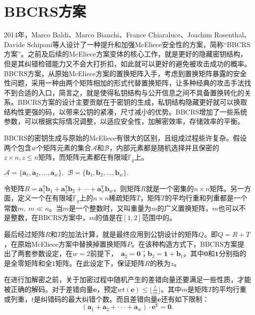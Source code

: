 \section{BBCRS方案}
2014年，Marco Baldi、Marco Bianchi、France Chiaraluce、Joachim Rosenthal、Davide Schipani等人设计了一种提升和加强McEliece安全性的方案，简称“BBCRS方案”。之前及后续的McEliece方案变体的核心工作，就是更好的隐藏密钥结构，但是其纠错检错能力又不会大打折扣，如此就可以更好的避免被攻击成功的概率\cite{Baldi2017Post}。BBCRS方案，从原始McEliece方案的置换矩阵入手，考虑到置换矩阵暴露的安全性问题，采用一种由两个矩阵相加的形式代替置换矩阵，让多种经典的攻击手法找不到合适的入口，简言之，就是使得私钥结构与公开信息之间不具备置换转化的关系。BBCRS方案的设计主要贡献在于密钥的生成，私钥结构隐藏更好就可以换取结构性更强的码，以带来公钥的紧凑，尺寸减小的优势。BBCRS增加了一些系统参数，可以根据实际情况调整，以适应安全性，加解密效率，存储效率的平衡。

BBCRS的密钥生成与原始的McEliece有很大的区别，且组成过程些许复杂。假设两个包含$w$个矩阵元素的集合$\mathcal{A}$和$\mathcal{B}$，内部元素都是随机选择并且保密的$z \times n, z \leq n$矩阵，而矩阵元素都在有限域$\mathbb{F}_q$上。
\begin{center}
	$\mathcal{A} = \{\mathbf{a}_1,\mathbf{a}_2,...,\mathbf{a}_w\},~$$~\mathcal{B} = \{\mathbf{b}_1,\mathbf{b}_2,...,\mathbf{b}_w\}.$
\end{center}
\begin{flushleft}
	令矩阵$R = \mathbf{a}_1^\mathtt{T}\mathbf{b}_1 + \mathbf{a}_2^\mathtt{T}\mathbf{b}_2 + \cdots + \mathbf{a}_w^\mathtt{T}\mathbf{b}_w$，则矩阵$R$就是一个密集的$n \times n$矩阵。另一方面，定义一个在有限域$\mathbb{F}_q$上的$n \times n$稀疏矩阵$T$，矩阵$T$的平均行重和列重都是一个常数$m,~ m \ll n$。当$m$是一个整数时，又叫重量为$m$的广义置换矩阵，$m$也可以不是整数，在BBCRS方案中，$m$的值是在$[1,2]$范围中的。
\end{flushleft}

最后经过矩阵$R$和$T$的加法计算，就是最终应用到公钥设计的矩阵$Q$。即$Q=R+T$，在原始McEliece方案中替换掉置换矩阵$P$。在该种构造方式下，BBCRS方案提出了两套参数设定，在$w = 2$前提下，~$\mathbf{a}_2 = \mathbf{0}$；$\mathbf{b}_2=\mathbf{1} + \mathbf{b}_1$。其中$\mathbf{0}$和$\mathbf{1}$分别指的是全零矩阵和全$1$矩阵。在此设定下，保证矩阵$R$的秩为$z$。

在进行加解密之前，关于加密过程中随机产生的差错向量还要满足一些性质，才能被正确的解码。对于差错向量$\mathbf{e}$，预定$wt(\mathbf{e}) \leq \lfloor \frac{t}{m} \rfloor$。其中$m$是矩阵$T$的平均行重或列重，$t$是纠错码的最大纠错个数。而且差错向量$\mathbf{e}$还有如下限制：
\begin{equation}
	(\mathbf{a}_1 + \mathbf{a}_2 + ··· + \mathbf{a}_w) \cdot \mathbf{e}^\mathtt{T} = \mathbf{0}.
\end{equation}


